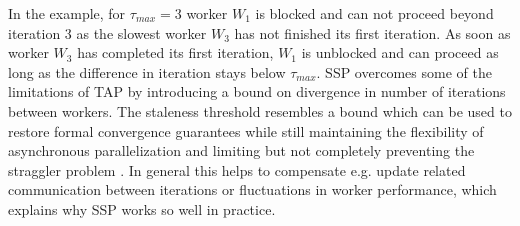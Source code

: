 In the example, for $\tau_{max} = 3$ worker $W_1$ is blocked and can not proceed beyond iteration 3 as the slowest worker $W_3$ has not finished its first iteration.
As soon as worker $W_3$ has completed its first iteration, $W_1$ is unblocked and can proceed as long as the difference in iteration stays below $\tau_{max}$.
SSP overcomes some of the limitations of TAP by introducing a bound on divergence in number of iterations between workers.
The staleness threshold resembles a bound which can be used to restore formal convergence guarantees while still maintaining the flexibility of asynchronous parallelization and limiting but not completely preventing the straggler problem \cite{cipar2013solving}.
In general this helps to compensate e.g. update related communication between iterations or fluctuations in worker performance, which explains why SSP works so well in practice.
